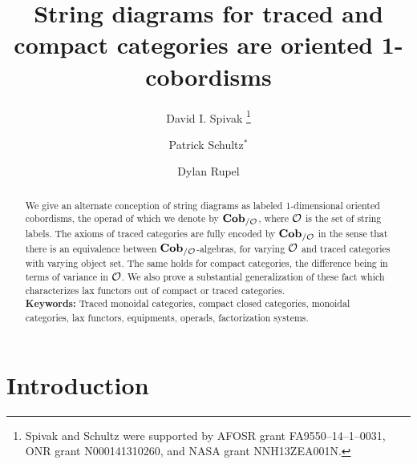 \documentclass[11pt,oneside,article]{memoir}
\title{String diagrams for traced and compact categories are oriented 1-cobordisms}
\author{
   David I. Spivak%
      \thanks{Spivak and Schultz were supported by AFOSR grant FA9550--14--1--0031, ONR grant N000141310260, and NASA grant NNH13ZEA001N.}
   \and Patrick Schultz${}^*$%
   \and Dylan Rupel
}
\date{\vspace{-3ex}}
\begin{document}
\tightlists
\firmlists

\maketitle
\begin{abstract}
   We give an alternate conception of string diagrams as labeled 1-dimensional oriented cobordisms, the
   operad of which we denote by $\mathbf{Cob}_{/\mathcal{O}}$, where $\mathcal{O}$ is the set of string labels. The axioms of traced categories are fully encoded by $\mathbf{Cob}_{/\mathcal{O}}$ 
   in the sense that there is an equivalence between $\mathbf{Cob}_{/\mathcal{O}}$-algebras, for varying $\mathcal{O}$ and
   traced categories with varying object set. The same holds for compact categories, the difference being in terms of variance in $\mathcal{O}$. We also prove a substantial generalization of these fact which characterizes 
   lax functors out of compact or traced categories. \\

   \noindent\textbf{Keywords:} Traced monoidal categories, compact closed categories, monoidal categories, lax functors, equipments, operads, factorization systems.
\end{abstract}


\chapter{Introduction}\label{chap:intro}
\end{document}
